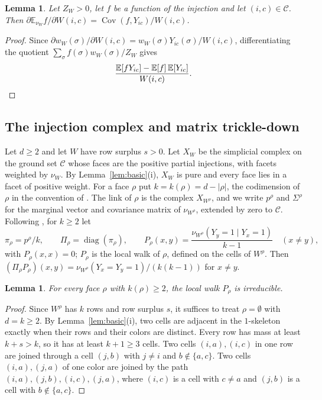 \documentclass{amsart}
\numberwithin{equation}{section}
\theoremstyle{plain}
\newtheorem{lemma}[theorem]{Lemma}
\theoremstyle{definition}
\theoremstyle{remark}
\newcommand{\E}{\mathbb{E}}
\newcommand{\Cov}{\operatorname{Cov}}
\newcommand{\diag}{\operatorname{diag}}
\newcommand{\cC}{\mathcal{C}}
\begin{document}
\begin{lemma}\label{lem:derivative}
Let $Z_W>0$, let $f$ be a function of the injection and let $(i,c)\in\cC$. Then $\partial\E_{\nu_W}f/\partial W(i,c)=\Cov(f,Y_{ic})/W(i,c)$.
\end{lemma}

\begin{proof}
Since $\partial w_W(\sigma)/\partial W(i,c)=w_W(\sigma)Y_{ic}(\sigma)/W(i,c)$, differentiating the quotient $\sum_\sigma f(\sigma)w_W(\sigma)/Z_W$ gives
\[
\frac{\E[fY_{ic}]-\E[f]\,\E[Y_{ic}]}{W(i,c)}.\qedhere
\]
\end{proof}

\subsection{The injection complex and matrix trickle-down}
Let $d\ge2$ and let $W$ have row surplus $s>0$. Let $X_W$ be the simplicial complex on the ground set $\cC$ whose faces are the positive partial injections, with facets weighted by $\nu_W$. By Lemma~\ref{lem:basic}(i), $X_W$ is pure and every face lies in a facet of positive weight. For a face $\rho$ put $k=k(\rho)=d-|\rho|$, the codimension of $\rho$ in the convention of \cite{ALG}. The link of $\rho$ is the complex $X_{W^\rho}$, and we write $p^\rho$ and $\Sigma^\rho$ for the marginal vector and covariance matrix of $\nu_{W^\rho}$, extended by zero to $\cC$. Following \cite{ALG}, for $k\ge2$ let
\[
\pi_\rho=p^\rho/k,\qquad\Pi_\rho=\diag(\pi_\rho),\qquad
P_\rho(x,y)=\frac{\nu_{W^\rho}(Y_y=1\mid Y_x=1)}{k-1}\quad(x\ne y),
\]
with $P_\rho(x,x)=0$; $P_\rho$ is the local walk of $\rho$, defined on the cells of $W^\rho$. Then $(\Pi_\rho P_\rho)(x,y)=\nu_{W^\rho}(Y_x=Y_y=1)/(k(k-1))$ for $x\ne y$.

\begin{lemma}\label{lem:connected}
For every face $\rho$ with $k(\rho)\ge2$, the local walk $P_\rho$ is irreducible.
\end{lemma}

\begin{proof}
Since $W^\rho$ has $k$ rows and row surplus $s$, it suffices to treat $\rho=\emptyset$ with $d=k\ge2$. By Lemma~\ref{lem:basic}(i), two cells are adjacent in the $1$-skeleton exactly when their rows and their colors are distinct. Every row has mass at least $k+s>k$, so it has at least $k+1\ge3$ cells. Two cells $(i,a),(i,c)$ in one row are joined through a cell $(j,b)$ with $j\ne i$ and $b\notin\{a,c\}$. Two cells $(i,a),(j,a)$ of one color are joined by the path $(i,a),(j,b),(i,c),(j,a)$, where $(i,c)$ is a cell with $c\ne a$ and $(j,b)$ is a cell with $b\notin\{a,c\}$.
\end{proof}
\end{document}
